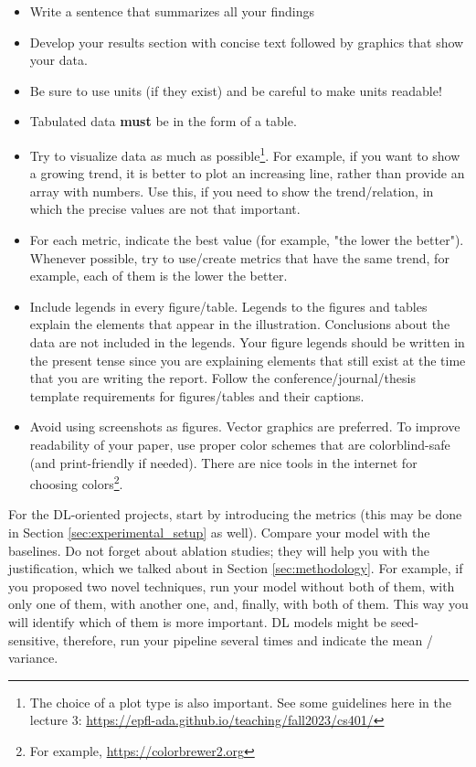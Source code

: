 \documentclass[10pt,conference,compsocconf]{IEEEtran}
\begin{document}
\begin{itemize}
	\item Write a sentence that summarizes all your findings
	\item Develop your results section with concise text followed by graphics that show your data.
	\item Be sure to use units (if they exist) and be careful to make units readable!
	\item Tabulated data \textbf{must} be in the form of a table.
	\item Try to visualize data as much as possible\footnote{The choice of a plot type is also important. See some guidelines here in the lecture 3: \url{https://epfl-ada.github.io/teaching/fall2023/cs401/}}. For example, if you want to show a growing trend, it is better to plot an increasing line, rather than provide an array with numbers. Use this, if you need to show the trend/relation, in which the precise values are not that important.
	\item For each metric, indicate the best value (for example, "the lower the better"). Whenever possible, try to use/create metrics that have the same trend, for example, each of them is the lower the better.
	\item Include legends in every figure/table. Legends to the figures and tables explain the elements that appear in the illustration. Conclusions about the data are not included in the legends. Your figure legends should be written in the present tense since you are explaining elements that still exist at the time that you are writing the report. Follow the conference/journal/thesis template requirements for figures/tables and their captions.
	\item Avoid using screenshots as figures. Vector graphics are preferred. To improve readability of your paper, use proper color schemes that are colorblind-safe (and print-friendly if needed). There are nice tools in the internet for choosing colors\footnote{For example, \url{https://colorbrewer2.org}}.
\end{itemize}

For the DL-oriented projects, start by introducing the metrics (this may be done in Section \ref{sec:experimental_setup} as well). Compare your model with the baselines. Do not forget about ablation studies; they will help you with the justification, which we talked about in Section \ref{sec:methodology}. For example, if you proposed two novel techniques, run your model without both of them, with only one of them, with another one, and, finally, with both of them. This way you will identify which of them is more important. DL models might be seed-sensitive, therefore, run your pipeline several times and indicate the mean / variance.
\end{document}
